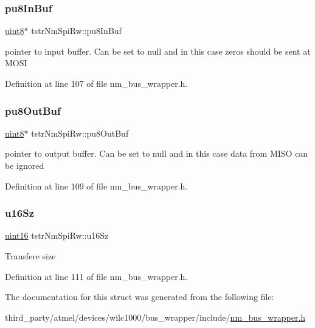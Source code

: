 \subsubsection{\texorpdfstring{pu8\+In\+Buf}{pu8InBuf}}
{\footnotesize\ttfamily \hyperlink{group__DataT_ga4df709a77647e870bbf1d955b8edc9a6}{uint8}$\ast$ tstr\+Nm\+Spi\+Rw\+::pu8\+In\+Buf}

pointer to input buffer. Can be set to null and in this case zeros should be sent at M\+O\+SI 

Definition at line 107 of file nm\+\_\+bus\+\_\+wrapper.\+h.

\mbox{\label{structtstrNmSpiRw_a6778f8ba906b9eb363ac0422fca66dd5}} 
\subsubsection{\texorpdfstring{pu8\+Out\+Buf}{pu8OutBuf}}
{\footnotesize\ttfamily \hyperlink{group__DataT_ga4df709a77647e870bbf1d955b8edc9a6}{uint8}$\ast$ tstr\+Nm\+Spi\+Rw\+::pu8\+Out\+Buf}

pointer to output buffer. Can be set to null and in this case data from M\+I\+SO can be ignored 

Definition at line 109 of file nm\+\_\+bus\+\_\+wrapper.\+h.

\mbox{\label{structtstrNmSpiRw_a7daa8262b96cb0543eb9189c65622c72}} 
\subsubsection{\texorpdfstring{u16\+Sz}{u16Sz}}
{\footnotesize\ttfamily \hyperlink{group__DataT_ga1daa745171fc6e31d942c161422a76f9}{uint16} tstr\+Nm\+Spi\+Rw\+::u16\+Sz}

Transfere size 

Definition at line 111 of file nm\+\_\+bus\+\_\+wrapper.\+h.



The documentation for this struct was generated from the following file\+:\begin{DoxyCompactItemize}
\item 
third\+\_\+party/atmel/devices/wilc1000/bus\+\_\+wrapper/include/\hyperlink{nm__bus__wrapper_8h}{nm\+\_\+bus\+\_\+wrapper.\+h}\end{DoxyCompactItemize}
